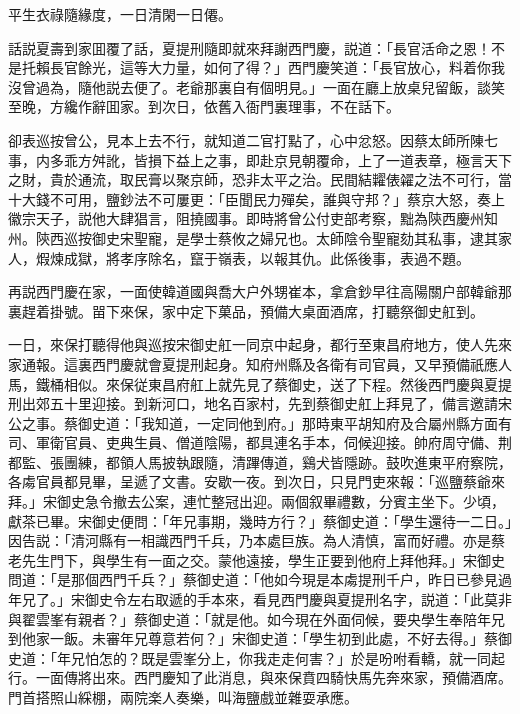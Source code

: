 平生衣祿隨緣度，一日清閑一日僊。

話説夏壽到家囬覆了話，夏提刑隨即就來拜謝西門慶，説道：「長官活命之恩！不是托賴長官餘光，這等大力量，如何了得？」西門慶笑道：「長官放心，料着你我沒曾過為，隨他説去便了。老爺那裏自有個明見。」一面在廳上放桌兒留飯，談笑至晚，方纔作辭囬家。到次日，依舊入衙門裏理事，不在話下。

卻表巡按曾公，見本上去不行，就知道二官打點了，心中忿怒。因蔡太師所陳七事，内多乖方舛訛，皆損下益上之事，即赴京見朝覆命，上了一道表章，極言天下之財，貴於通流，取民膏以聚京師，恐非太平之治。民間結糶俵糴之法不可行，當十大錢不可用，鹽鈔法不可屢更：「臣聞民力殫矣，誰與守邦？」蔡京大怒，奏上徽宗天子，説他大肆猖言，阻撓國事。即時將曾公付吏部考察，黜為陝西慶州知州。陝西巡按御史宋聖寵，是學士蔡攸之婦兄也。太師陰令聖寵劾其私事，逮其家人，煆煉成獄，將孝序除名，竄于嶺表，以報其仇。此係後事，表過不題。

再説西門慶在家，一面使韓道國與喬大户外甥崔本，拿倉鈔早往高陽關户部韓爺那裏趕着掛號。㽞下來保，家中定下菓品，預備大桌面酒席，打聽祭御史舡到。

一日，來保打聽得他與巡按宋御史舡一同京中起身，都行至東昌府地方，使人先來家通報。這裏西門慶就會夏提刑起身。知府州縣及各衛有司官員，又早預備祇應人馬，鐵桶相似。來保従東昌府舡上就先見了蔡御史，送了下程。然後西門慶與夏提刑出郊五十里迎接。到新河口，地名百家村，先到蔡御史舡上拜見了，備言邀請宋公之事。蔡御史道：「我知道，一定同他到府。」那時東平胡知府及合屬州縣方面有司、軍衛官員、吏典生員、僧道陰陽，都具連名手本，伺候迎接。帥府周守備、荆都監、張團練，都領人馬披執跟隨，清蹕傳道，鷄犬皆隱跡。鼓吹進東平府察院，各䖏官員都見畢，呈遞了文書。安歇一夜。到次日，只見門吏來報：「巡鹽蔡爺來拜。」宋御史急令撤去公案，連忙整冠出迎。兩個叙畢禮數，分賓主坐下。少頃，獻茶已畢。宋御史便問：「年兄事期，幾時方行？」蔡御史道：「學生還待一二日。」因告説：「清河縣有一相識西門千兵，乃本處巨族。為人清慎，富而好禮。亦是蔡老先生門下，與學生有一面之交。蒙他遠接，學生正要到他府上拜他拜。」宋御史問道：「是那個西門千兵？」蔡御史道：「他如今現是本䖏提刑千户，昨日已參見過年兄了。」宋御史令左右取遞的手本來，看見西門慶與夏提刑名字，説道：「此莫非與翟雲峯有親者？」蔡御史道：「就是他。如今現在外面伺候，要央學生奉陪年兄到他家一飯。未審年兄尊意若何？」宋御史道：「學生初到此處，不好去得。」蔡御史道：「年兄怕怎的？既是雲峯分上，你我走走何害？」於是吩咐看轎，就一同起行。一面傳將出來。西門慶知了此消息，與來保賁四騎快馬先奔來家，預備酒席。門首搭照山綵棚，兩院楽人奏樂，叫海鹽戲並雜耍承應。

